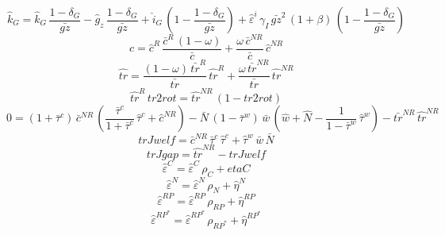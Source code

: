 \begin{dmath}
{\hat{k}_G}={\hat{k}_G}\, \frac{1-{\delta_G}}{{\bar{gz}}}-{{\hat{g}_z}}\, \frac{1-{\delta_G}}{{\bar{gz}}}+{\hat{i}_G}\, \left(1-\frac{1-{\delta_G}}{{\bar{gz}}}\right)+{\hat{\varepsilon}^i}\, {\gamma_I}\, {\bar{gz}}^{2}\, \left(1+{\beta}\right)\, \left(1-\frac{1-{\delta_G}}{{\bar{gz}}}\right)
\end{dmath}
\begin{dmath}
{\hat{c}}={\hat{c}^R}\, \frac{{\bar{c}^R}\, \left(1-{\omega}\right)}{{\bar{c}}}+\frac{{\omega}\, {\bar{c}^{NR}}}{{\bar{c}}}\, {\hat{c}^{NR}}
\end{dmath}
\begin{dmath}
{\hat{tr}}=\frac{\left(1-{\omega}\right)\, {\bar{tr}^{R}}}{{\bar{tr}}}\, {\hat{tr}^R}+\frac{{\omega}\, {\bar{tr}^{NR}}}{{\bar{tr}}}\, {\hat{tr}^{NR}}
\end{dmath}
\begin{dmath}
{\hat{tr}^R}\, {tr2rot}={\hat{tr}^{NR}}\, \left(1-{tr2rot}\right)
\end{dmath}
\begin{dmath}
0=\left(1+{\bar{\tau}^c}\right)\, {\bar{c}^{NR}}\, \left(\frac{{\bar{\tau}^c}}{1+{\bar{\tau}^c}}\, {\hat{\tau}^c}+{\hat{c}^{NR}}\right)-{\bar{N}}\, \left(1-{\bar{\tau}^w}\right)\, {\bar{w}}\, \left({\hat{w}}+{\hat{N}}-\frac{1}{1-{\bar{\tau}^w}}\, {\hat{\tau}^w}\right)-{\bar{tr}^{NR}}\, {\hat{tr}^{NR}}
\end{dmath}
\begin{dmath}
{trJwelf}={\bar{c}^{NR}}\, {\bar{\tau}^c}\, {\hat{\tau}^c}+{\hat{\tau}^w}\, {\bar{w}}\, {\bar{N}}
\end{dmath}
\begin{dmath}
{trJgap}={\hat{tr}^{NR}}-{trJwelf}
\end{dmath}
\begin{dmath}
{\hat{\varepsilon}^C}={\hat{\varepsilon}^C}\, {\rho_{C}}+{etaC}
\end{dmath}
\begin{dmath}
{\hat{\varepsilon}^N}={\hat{\varepsilon}^N}\, {\rho_{N}}+{\hat{\eta}^{N}}
\end{dmath}
\begin{dmath}
{\hat{\varepsilon}^{RP}}={\hat{\varepsilon}^{RP}}\, {\rho_{RP}}+{\hat{\eta}^{RP}}
\end{dmath}
\begin{dmath}
{\hat{\varepsilon}^{RP^*}}={\hat{\varepsilon}^{RP^*}}\, {\rho_{RP^*}}+{\hat{\eta}^{RP^*}}
\end{dmath}
